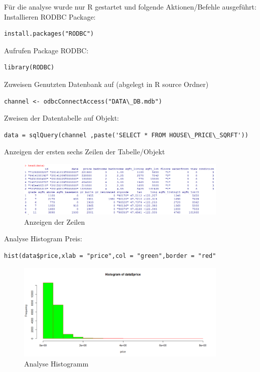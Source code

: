 Für die analyse wurde nur R gestartet und folgende Aktionen/Befehle ausgeführt:
Installieren RODBC Package:
\begin{lstlisting}
install.packages("RODBC")
\end{lstlisting}
        Aufrufen Package RODBC:
\begin{lstlisting}
library(RODBC)
\end{lstlisting}
Zuweisen Genutzten Datenbank auf (abgelegt in R source Ordner)
\begin{lstlisting}
channel <- odbcConnectAccess("DATA\_DB.mdb")
\end{lstlisting}

Zweisen der Datentabelle auf Objekt:
\begin{lstlisting}
data = sqlQuery(channel ,paste('SELECT * FROM HOUSE\_PRICE\_SQRFT'))
\end{lstlisting}

Anzeigen der ersten sechs Zeilen der Tabelle/Objekt
\begin{figure}[!htb]
        \begin{minipage}{1\textwidth}
                \centering
                \includegraphics[width=0.90\textwidth]{pics/rjdbc2.png}\par\vspace{0cm}
                \caption{Anzeigen der Zeilen}
                \label{fig:rjdbc2}
        \end{minipage}
\end{figure}

Analyse Histogram Preis:
\begin{lstlisting}
hist(data$price,xlab = "price",col = "green",border = "red"
\end{lstlisting}

\begin{figure}[!htb]
        \begin{minipage}{1\textwidth}
                \centering
                \includegraphics[width=0.90\textwidth]{pics/rjdbc3.png}\par\vspace{0cm}
                \caption{Analyse Histogramm}
                \label{fig:rjdbc3}
        \end{minipage}
\end{figure}

